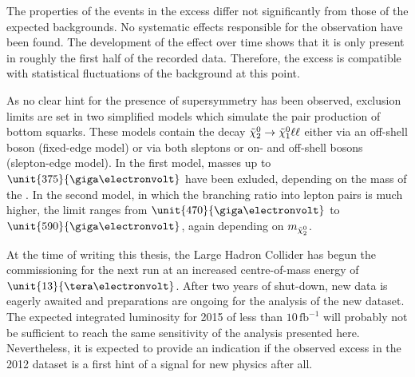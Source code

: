 The properties of the events in the excess differ not significantly from those of the expected backgrounds. No systematic effects responsible for the observation have been found. The development of the effect over time shows that it is only present in roughly the first half of the recorded data. Therefore, the excess is compatible with statistical fluctuations of the background at this point.

As no clear hint for the presence of supersymmetry has been observed, exclusion limits are set in two simplified models which simulate the pair production of bottom squarks. These models contain the decay ${\tilde{\chi}^0_2} \rightarrow {\tilde{\chi}^0_1} \ell\ell$ either via an off-shell \Z boson (fixed-edge model) or via both sleptons or on- and off-shell \Z bosons (slepton-edge model). In the first model, \sbottom masses up to $\unit{375}{\giga\electronvolt}$ have been exluded, depending on the mass of the \secondchi. In the second model, in which the branching ratio into lepton pairs is much higher, the limit ranges from $\unit{470}{\giga\electronvolt}$ to $\unit{590}{\giga\electronvolt}$, again depending on $m_{{\tilde{\chi}^0_2}}$. 

At the time of writing this thesis, the Large Hadron Collider has begun the commissioning for the next run at  an increased centre-of-mass energy of $\unit{13}{\tera\electronvolt}$. After two years of shut-down, new data is eagerly awaited and preparations are ongoing for the analysis of the new dataset. The expected integrated luminosity for 2015 of less than $10\,\mathrm{fb}^{-1}$ will probably not be sufficient to reach the same sensitivity of the analysis presented here. Nevertheless, it is expected to provide an indication if the observed excess in the 2012 dataset is a first hint of a signal for new physics after all. 
